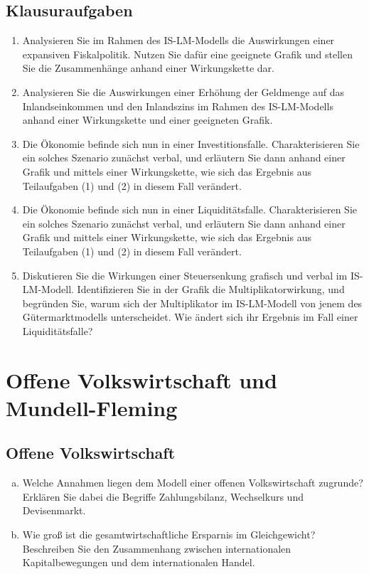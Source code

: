 \documentclass{scrartcl}
\begin{document}
\subsection{Klausuraufgaben}
\begin{enumerate}
  \item Analysieren Sie im Rahmen des IS-LM-Modells die Auswirkungen einer expansiven Fiskalpolitik. Nutzen Sie daf\"{u}r eine geeignete Grafik und stellen Sie die Zusammenh\"{a}nge anhand einer Wirkungskette dar.
  \item Analysieren Sie die Auswirkungen einer Erh\"{o}hung der Geldmenge auf das Inlandseinkommen und den Inlandszins im Rahmen des IS-LM-Modells anhand einer Wirkungskette und einer geeigneten Grafik.
  \item Die \"{O}konomie befinde sich nun in einer Investitionsfalle. Charakterisieren Sie ein solches Szenario zun\"{a}chst verbal, und erl\"{a}utern Sie dann anhand einer Grafik und mittels einer Wirkungskette, wie sich das Ergebnis aus Teilaufgaben (1) und (2) in diesem Fall ver\"{a}ndert.
  \item Die \"{O}konomie befinde sich nun in einer Liquidit\"{a}tsfalle. Charakterisieren Sie ein solches Szenario zun\"{a}chst verbal, und erl\"{a}utern Sie dann anhand einer Grafik und mittels einer Wirkungskette, wie sich das Ergebnis aus Teilaufgaben (1) und (2) in diesem Fall ver\"{a}ndert.
  \item Diskutieren Sie die Wirkungen einer Steuersenkung grafisch und verbal im IS-LM-Modell. Identifizieren Sie in der Grafik die Multiplikatorwirkung, und begründen Sie,  warum sich der Multiplikator im IS-LM-Modell von jenem des Gütermarktmodells
  unterscheidet. Wie ändert sich ihr Ergebnis im Fall einer Liquiditätsfalle?
\end{enumerate}

\newpage
\section{Offene Volkswirtschaft und Mundell-Fleming}

\subsection{Offene Volkswirtschaft}
\begin{enumerate}[(a)]
\item Welche Annahmen liegen dem Modell einer offenen Volkswirtschaft zugrunde? Erkl\"{a}ren Sie dabei die Begriffe Zahlungsbilanz, Wechselkurs und Devisenmarkt.
\item Wie gro{\ss} ist die gesamtwirtschaftliche Ersparnis im Gleichgewicht? Beschreiben Sie den Zusammenhang zwischen internationalen Kapitalbewegungen und dem internationalen Handel.
\end{enumerate}
\end{document}
